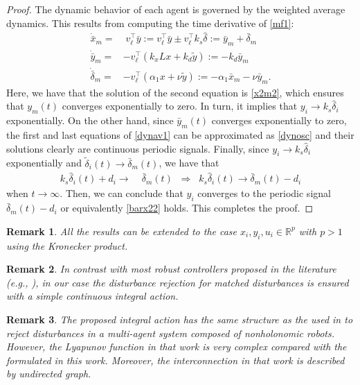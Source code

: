 \documentclass[journal,twoside]{IEEEtran}
\newtheorem{remark}{Remark}
\def\rea{\mathbb{R}}
\def\rea{\mathbb{R}}
\begin{document}
\begin{proof}
The dynamic behavior of each agent is governed by the weighted average dynamics. 
This results from computing the time derivative of \eqref{mf1}:
\begin{align}
\dot {\bar x}_{m}=&\;  v_\ell^\top\bar y := v_\ell^\top \bar y  \pm v_\ell^\top k_s \hat \delta:=  \bar y_{m} + \bar \delta_m    \nonumber \\
\dot {\bar y}_{m}= &- v_\ell^\top \left( k_x L x +k_d  \tilde y  \right):= - k_d \bar y_{m}  \nonumber \\
\dot {\bar \delta}_m=& -v_\ell^\top (\alpha_1 x + \nu  \tilde y):= - \alpha_1 \bar x_{m}- \nu \bar y_{m}.
\label{dynav1}
\end{align}
Here, we have that the solution of the second equation is \eqref{x2m2}, which ensures that $y_{m}(t)$ converges exponentially to zero.
In turn, it implies that $y_{i} \to k_s \hat \delta_i $ exponentially. 
On the other hand, since $\bar {y}_{m}(t)$ converges exponentially to zero, the first and last equations of \eqref{dynav1} can be approximated as \eqref{dynosc}
 and their solutions clearly are continuous periodic signals. 
Finally, since  $y_{i} \to k_s \hat \delta_i $ exponentially and   $\tilde \delta_i (t) \to  \bar \delta_m(t)$, we have that 
\begin{align}
k_s \hat \delta_i (t)+d_i \to & \; \bar \delta_m(t)  \;\;\Rightarrow \;\; k_s \hat \delta_i (t) \to \bar \delta_m(t) -d_i
\end{align}
when  $t \to \infty$. Then, we can conclude that $y_{i}$ converges to the periodic signal $\bar \delta_m(t) -d_i$ or equivalently \eqref{barx22} holds.
This completes the proof.
 \end{proof}



\begin{remark} \em
 All the results can be extended to the case $x_i, y_i, u_i \in \rea^p$ with $p>1$ using the Kronecker product.
\end{remark}

\begin{remark} \em
In contrast with most robust controllers proposed in the literature (e.g., \cite{LVetal17, LIUWUZHO, WANGetal21}), in our case the disturbance rejection for matched disturbances is ensured with a simple continuous integral action. 
\end{remark}

\begin{remark} \em
The  proposed integral action has the same structure as the used in \cite{ROMNUNALD} to reject disturbances in a multi-agent system composed of nonholonomic robots. However, the Lyapunov function in that work is very complex compared with the formulated in this work. Moreover, the  interconnection in that work is described by  undirected graph.
\end{remark}
\end{document}
